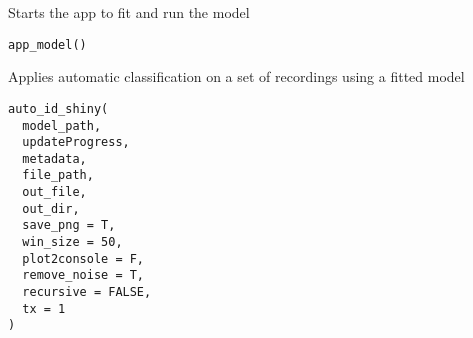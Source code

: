 \documentclass[letterpaper]{book}
\begin{document}
%
\begin{Description}\relax
Starts the app to fit  and run the model
\end{Description}
%
\begin{Usage}
\begin{verbatim}
app_model()
\end{verbatim}
\end{Usage}
%
\begin{Description}\relax
Applies automatic classification on a set of recordings
using a fitted model
\end{Description}
%
\begin{Usage}
\begin{verbatim}
auto_id_shiny(
  model_path,
  updateProgress,
  metadata,
  file_path,
  out_file,
  out_dir,
  save_png = T,
  win_size = 50,
  plot2console = F,
  remove_noise = T,
  recursive = FALSE,
  tx = 1
)
\end{verbatim}
\end{Usage}
%
\end{document}
